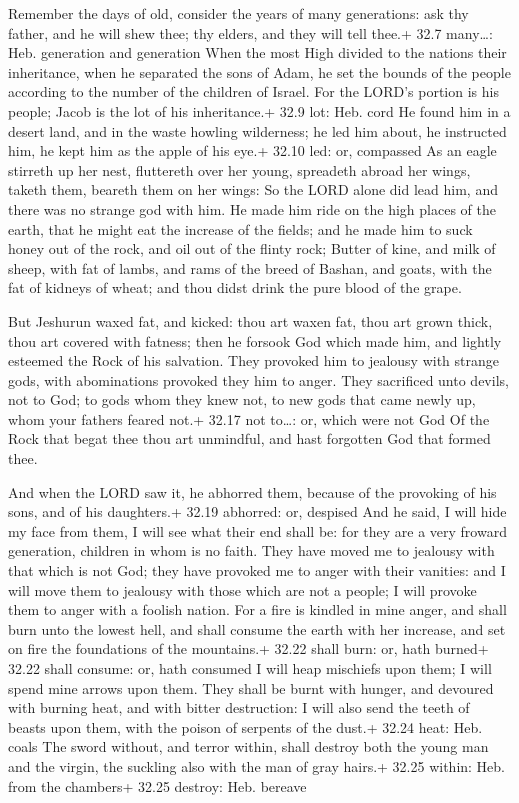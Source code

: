  Remember the days of old, consider the years of many
generations: ask thy father, and he will shew thee; thy elders, and they
will tell thee.+ 32.7 many\ldots: Heb. generation and generation
 When the most High divided to the nations their
inheritance, when he separated the sons of Adam, he set the bounds of
the people according to the number of the children of Israel.
 For the LORD's portion is his people; Jacob is the lot of
his inheritance.+ 32.9 lot: Heb. cord  He found him in a
desert land, and in the waste howling wilderness; he led him about, he
instructed him, he kept him as the apple of his eye.+ 32.10 led: or,
compassed  As an eagle stirreth up her nest, fluttereth
over her young, spreadeth abroad her wings, taketh them, beareth them on
her wings:  So the LORD alone did lead him, and there was
no strange god with him.  He made him ride on the high
places of the earth, that he might eat the increase of the fields; and
he made him to suck honey out of the rock, and oil out of the flinty
rock;  Butter of kine, and milk of sheep, with fat of
lambs, and rams of the breed of Bashan, and goats, with the fat of
kidneys of wheat; and thou didst drink the pure blood of the grape.

 But Jeshurun waxed fat, and kicked: thou art waxen fat,
thou art grown thick, thou art covered with fatness; then he forsook God
which made him, and lightly esteemed the Rock of his salvation.
 They provoked him to jealousy with strange gods, with
abominations provoked they him to anger.  They sacrificed
unto devils, not to God; to gods whom they knew not, to new gods that
came newly up, whom your fathers feared not.+ 32.17 not to\ldots: or,
which were not God  Of the Rock that begat thee thou art
unmindful, and hast forgotten God that formed thee.

 And when the LORD saw it, he abhorred them, because of the
provoking of his sons, and of his daughters.+ 32.19 abhorred: or,
despised  And he said, I will hide my face from them, I
will see what their end shall be: for they are a very froward
generation, children in whom is no faith.  They have moved
me to jealousy with that which is not God; they have provoked me to
anger with their vanities: and I will move them to jealousy with those
which are not a people; I will provoke them to anger with a foolish
nation.  For a fire is kindled in mine anger, and shall
burn unto the lowest hell, and shall consume the earth with her
increase, and set on fire the foundations of the mountains.+ 32.22 shall
burn: or, hath burned+ 32.22 shall consume: or, hath consumed
 I will heap mischiefs upon them; I will spend mine arrows
upon them.  They shall be burnt with hunger, and devoured
with burning heat, and with bitter destruction: I will also send the
teeth of beasts upon them, with the poison of serpents of the dust.+
32.24 heat: Heb. coals  The sword without, and terror
within, shall destroy both the young man and the virgin, the suckling
also with the man of gray hairs.+ 32.25 within: Heb. from the chambers+
32.25 destroy: Heb. bereave

